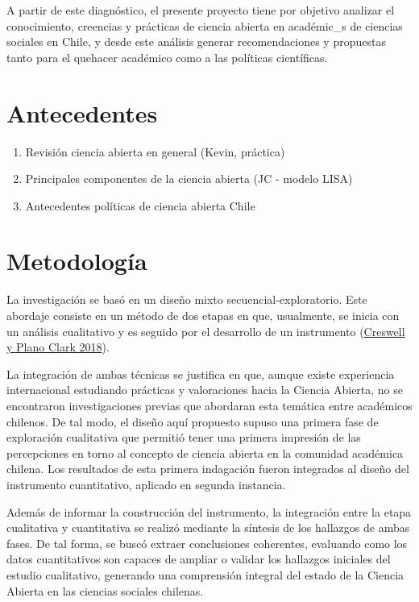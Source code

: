\documentclass[
  letterpaper,
  DIV=11,
  numbers=noendperiod]{scrreprt}
\begin{document}
A partir de este diagnóstico, el presente proyecto tiene por objetivo
analizar el conocimiento, creencias y prácticas de ciencia abierta en
académic\_s de ciencias sociales en Chile, y desde este análisis generar
recomendaciones y propuestas tanto para el quehacer académico como a las
políticas científicas.

\hypertarget{antecedentes}{%
\chapter{Antecedentes}\label{antecedentes}}

\begin{enumerate}
\def\labelenumi{\alph{enumi})}
\item
  Revisión ciencia abierta en general (Kevin, práctica)
\item
  Principales componentes de la ciencia abierta (JC - modelo LISA)
\item
  Antecedentes políticas de ciencia abierta Chile
\end{enumerate}

\hypertarget{metodologuxeda}{%
\chapter{Metodología}\label{metodologuxeda}}

La investigación se basó en un diseño mixto secuencial-exploratorio.
Este abordaje consiste en un método de dos etapas en que, usualmente, se
inicia con un análisis cualitativo y es seguido por el desarrollo de un
instrumento (\protect\hyperlink{ref-creswell_mixedmethods_2018}{Creswell
y Plano Clark 2018}).

La integración de ambas técnicas se justifica en que, aunque existe
experiencia internacional estudiando prácticas y valoraciones hacia la
Ciencia Abierta, no se encontraron investigaciones previas que abordaran
esta temática entre académicos chilenos. De tal modo, el diseño aquí
propuesto supuso una primera fase de exploración cualitativa que
permitió tener una primera impresión de las percepciones en torno al
concepto de ciencia abierta en la comunidad académica chilena. Los
resultados de esta primera indagación fueron integrados al diseño del
instrumento cuantitativo, aplicado en segunda instancia.

Además de informar la construcción del instrumento, la integración entre
la etapa cualitativa y cuantitativa se realizó mediante la síntesis de
los hallazgos de ambas fases. De tal forma, se buscó extraer
conclusiones coherentes, evaluando como los datos cuantitativos son
capaces de ampliar o validar los hallazgos iniciales del estudio
cualitativo, generando una comprensión integral del estado de la Ciencia
Abierta en las ciencias sociales chilenas.
\end{document}
